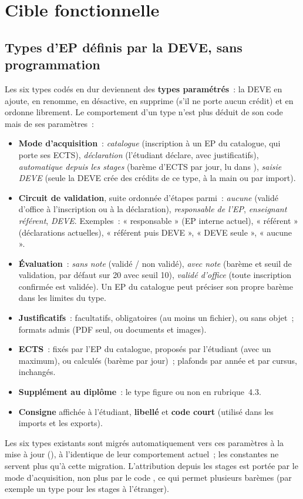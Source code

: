 \documentclass[11pt,a4paper]{article}
\newcommand{\code}[1]{\texttt{\detokenize{#1}}}
\begin{document}
\section{Cible fonctionnelle}\label{sec:cible}

\subsection{Types d'EP définis par la DEVE, sans programmation}\label{sec:types}

Les six types codés en dur deviennent des \textbf{types paramétrés}~: la DEVE en ajoute,
en renomme, en désactive, en supprime (s'il ne porte aucun crédit) et en ordonne
librement. Le comportement d'un type n'est plus déduit de son code mais de ses
paramètres~:
\begin{itemize}
  \item \textbf{Mode d'acquisition}~: \emph{catalogue} (inscription à un EP du catalogue,
    qui porte ses ECTS), \emph{déclaration} (l'étudiant déclare, avec justificatifs),
    \emph{automatique depuis les stages} (barème d'ECTS par jour, lu dans \code{mod_stage}),
    \emph{saisie DEVE} (seule la DEVE crée des crédits de ce type, à la main ou par import).
  \item \textbf{Circuit de validation}, suite ordonnée d'étapes parmi~: \emph{aucune}
    (validé d'office à l'inscription ou à la déclaration), \emph{responsable de l'EP},
    \emph{enseignant référent}, \emph{DEVE}. Exemples~: « responsable » (EP interne
    actuel), « référent » (déclarations actuelles), « référent puis DEVE », « DEVE seule »,
    « aucune ».
  \item \textbf{Évaluation}~: \emph{sans note} (validé / non validé), \emph{avec note}
    (barème et seuil de validation, par défaut sur 20 avec seuil 10), \emph{validé
    d'office} (toute inscription confirmée est validée). Un EP du catalogue peut préciser son
    propre barème dans les limites du type.
  \item \textbf{Justificatifs}~: facultatifs, obligatoires (au moins un fichier), ou sans
    objet~; formats admis (PDF seul, ou documents et images).
  \item \textbf{ECTS}~: fixés par l'EP du catalogue, proposés par l'étudiant (avec un
    maximum), ou calculés (barème par jour)~; plafonds par année et par cursus, inchangés.
  \item \textbf{Supplément au diplôme}~: le type figure ou non en rubrique~4.3.
  \item \textbf{Consigne} affichée à l'étudiant, \textbf{libellé} et \textbf{code court}
    (utilisé dans les imports et les exports).
\end{itemize}
Les six types existants sont migrés automatiquement vers ces paramètres à la mise à jour
(\code{db/upgrade.php}), à l'identique de leur comportement actuel~; les constantes
\code{EP_TYPE_*} ne servent plus qu'à cette migration. L'attribution depuis les stages est
portée par le mode d'acquisition, non plus par le code \code{stage}, ce qui permet
plusieurs barèmes (par exemple un type pour les stages à l'étranger).
\end{document}
